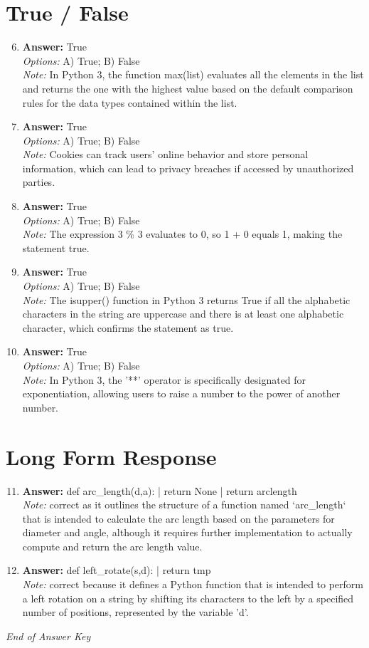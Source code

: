 \documentclass[12pt]{article}
\begin{document}
\section*{True / False}
\begin{enumerate}[label=\arabic*.]
\setcounter{enumi}{5}
\item \textbf{Answer:} True
\\ \textit{Options:} A) True; B) False
\\ \textit{Note:} In Python 3, the function max(list) evaluates all the elements in the list and returns the one with the highest value based on the default comparison rules for the data types contained within the list.
\item \textbf{Answer:} True
\\ \textit{Options:} A) True; B) False
\\ \textit{Note:} Cookies can track users' online behavior and store personal information, which can lead to privacy breaches if accessed by unauthorized parties.
\item \textbf{Answer:} True
\\ \textit{Options:} A) True; B) False
\\ \textit{Note:} The expression 3 \% 3 evaluates to 0, so 1 + 0 equals 1, making the statement true.
\item \textbf{Answer:} True
\\ \textit{Options:} A) True; B) False
\\ \textit{Note:} The isupper() function in Python 3 returns True if all the alphabetic characters in the string are uppercase and there is at least one alphabetic character, which confirms the statement as true.
\item \textbf{Answer:} True
\\ \textit{Options:} A) True; B) False
\\ \textit{Note:} In Python 3, the '**' operator is specifically designated for exponentiation, allowing users to raise a number to the power of another number.
\end{enumerate}

\section*{Long Form Response}
\begin{enumerate}[label=\arabic*.]
\setcounter{enumi}{10}
\item \textbf{Answer:} def arc\_length(d,a): | return None | return arclength
\\ \textit{Note:} correct as it outlines the structure of a function named `arc\_length` that is intended to calculate the arc length based on the parameters for diameter and angle, although it requires further implementation to actually compute and return the arc length value.
\item \textbf{Answer:} def left\_rotate(s,d): | return tmp
\\ \textit{Note:} correct because it defines a Python function that is intended to perform a left rotation on a string by shifting its characters to the left by a specified number of positions, represented by the variable 'd'.
\end{enumerate}

\vfill
\noindent\textit{End of Answer Key}
\end{document}
